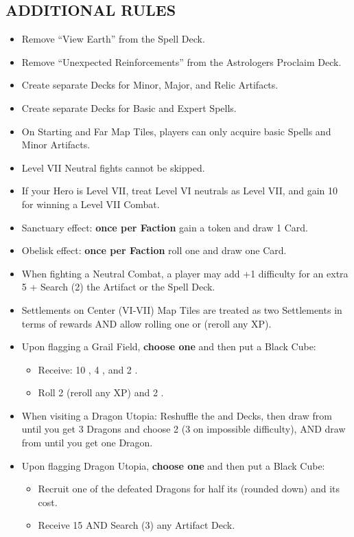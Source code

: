\begin{multicols*}{2}
\subsection*{\MakeUppercase{Additional Rules}}
\begin{itemize}
  \item Remove ``View Earth'' from the Spell Deck.
  \item Remove ``Unexpected Reinforcements'' from the Astrologers Proclaim Deck.
  \item Create separate Decks for Minor, Major, and Relic Artifacts.
  \item Create separate Decks for Basic and Expert Spells.
  \item On Starting and Far Map Tiles, players can only acquire basic Spells and Minor Artifacts.
  \item Level VII Neutral fights cannot be skipped.
  \item If your Hero is Level VII, treat Level VI neutrals as Level VII, and gain 10  for winning a Level VII Combat.
  \item Sanctuary effect: \textbf{once per Faction} gain a  token and draw 1 Card.
  \item Obelisk effect: \textbf{once per Faction} roll one  and draw one Card.
  \item When fighting a Neutral Combat, a player may add +1 difficulty for an extra 5  + Search (2) the Artifact or the Spell Deck.
  \item Settlements on Center (VI-VII) Map Tiles are treated as two Settlements in terms of rewards AND allow rolling one  or  (reroll any XP).
  \item Upon flagging a Grail Field, \textbf{choose one} and then put a Black Cube:
  \begin{itemize}
    \item Receive: 10 , 4 , and 2 .
    \item Roll 2  (reroll any XP) and 2 .
  \end{itemize}
  \item When visiting a Dragon Utopia: Reshuffle the  and  Decks, then draw from  until you get 3 Dragons and choose 2 (3 on impossible difficulty), AND draw from  until you get one Dragon.
  \item Upon flagging Dragon Utopia, \textbf{choose one} and then put a Black Cube:
  \begin{itemize}
    \item Recruit one of the defeated Dragons for half its  (rounded down) and its  cost.
    \item Receive 15  AND Search (3) any Artifact Deck.
  \end{itemize}
\end{itemize}


\end{multicols*}
